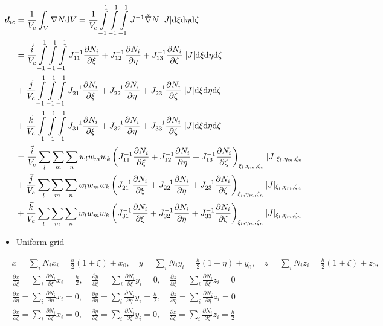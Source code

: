 \documentclass[11pt]{article}
\def\bbf#1{\mathchoice{\hbox{\boldmath$\displaystyle#1$}}
{\hbox{\boldmath$\textstyle#1$}} {\hbox{\boldmath$\scriptstyle#1$}} {\hbox{\boldmath$\scriptscriptstyle#1$}} }
\newcommand{\Vc}{V_c}
\newcommand{\dic}{\bbf{d}_{ic}}
\newcommand{\xxi}{\frac{\partial x}{\partial \xi}}
\newcommand{\yxi}{\frac{\partial y}{\partial \xi}}
\newcommand{\zxi}{\frac{\partial z}{\partial \xi}}
\newcommand{\xeta}{\frac{\partial x}{\partial \eta}}
\newcommand{\yeta}{\frac{\partial y}{\partial \eta}}
\newcommand{\zeeta}{\frac{\partial z}{\partial \eta}}
\newcommand{\xzeta}{\frac{\partial x}{\partial \zeta}}
\newcommand{\yzeta}{\frac{\partial y}{\partial \zeta}}
\newcommand{\zzeta}{\frac{\partial z}{\partial \zeta}}
\newcommand{\nixi}{\frac{\partial N_i}{\partial \xi}}
\newcommand{\nieta}{\frac{\partial N_i}{\partial \eta}}
\newcommand{\nizeta}{\frac{\partial N_i}{\partial \zeta}}
\newcommand{\md}{\mbox{d}}
\newcommand{\Int}{\int\limits}
\begin{document}
\begin{enumerate}
    \begin{align*}
    \dic &= \frac{1}{\Vc}\int_V \nabla N \md V
    = \frac{1}{\Vc} \Int_{-1}^{1}\Int_{-1}^{1}\Int_{-1}^{1} J^{-1} \tilde{\nabla} N\;  |J|\md \xi \md \eta \md \zeta \\
    &= \frac{\vec i}{\Vc} \Int_{-1}^{1}\Int_{-1}^{1}\Int_{-1}^{1} J_{11}^{-1}\nixi  + J_{12}^{-1}\nieta + J_{13}^{-1}\nizeta\; |J| \md \xi \md \eta \md \zeta \\
    &+ \frac{\vec j}{\Vc} \Int_{-1}^{1}\Int_{-1}^{1}\Int_{-1}^{1} J_{21}^{-1}\nixi  + J_{22}^{-1}\nieta + J_{23}^{-1}\nizeta\; |J| \md \xi \md \eta \md \zeta \\
    &+ \frac{\vec k}{\Vc} \Int_{-1}^{1}\Int_{-1}^{1}\Int_{-1}^{1} J_{31}^{-1}\nixi  + J_{32}^{-1}\nieta + J_{33}^{-1}\nizeta\; |J| \md \xi \md \eta \md \zeta \\
    &= \frac{\vec i}{\Vc} \sum_l \sum_m \sum_n w_l w_m w_k \left( J_{11}^{-1}\nixi  + J_{12}^{-1}\nieta + J_{13}^{-1}\nizeta \right)_{\xi_l, \eta_m, \zeta_n} |J|_{\xi_l, \eta_m, \zeta_n} \\
    &+ \frac{\vec j}{\Vc} \sum_l \sum_m \sum_n w_l w_m w_k \left( J_{21}^{-1}\nixi  + J_{22}^{-1}\nieta + J_{23}^{-1}\nizeta \right)_{\xi_l, \eta_m, \zeta_n} |J|_{\xi_l, \eta_m, \zeta_n} \\
    &+ \frac{\vec k}{\Vc} \sum_l \sum_m \sum_n w_l w_m w_k \left( J_{31}^{-1}\nixi  + J_{32}^{-1}\nieta + J_{33}^{-1}\nizeta \right)_{\xi_l, \eta_m, \zeta_n} |J|_{\xi_l, \eta_m, \zeta_n} \\
    \end{align*}

    \clearpage
    \begin{itemize}
        \item Uniform grid
    \end{itemize}

    \begin{align*}
    &x = \sum_i N_i x_i= \frac{h}{2}(1+\xi) + x_0, \quad  y= \sum_i N_i y_i = \frac{h}{2}(1+\eta) + y_0, \quad z = \sum_i N_i z_i = \frac{h}{2}(1+\zeta) + z_0,\\
    &\xxi = \sum_i \nixi x_i = \frac{h}{2}, \quad \yxi= \sum_i \nixi y_i = 0, \quad \zxi = \sum_i \nixi z_i = 0\\
    &\xeta = \sum_i \nieta x_i = 0, \quad \yeta= \sum_i \nieta y_i = \frac{h}{2}, \quad \zeeta = \sum_i \nieta z_i = 0 \\
    &\xzeta = \sum_i \nizeta x_i = 0, \quad \yzeta= \sum_i \nizeta y_i = 0, \quad \zzeta = \sum_i \nizeta z_i = \frac{h}{2}
    \end{align*}



\end{enumerate}
\end{document}
